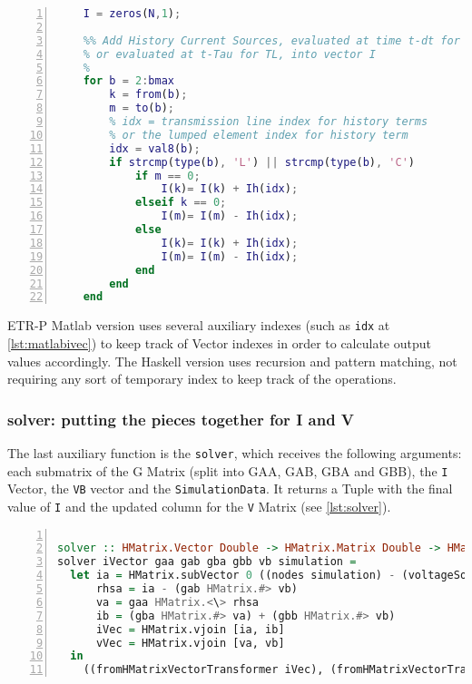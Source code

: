 \begin{lstlisting}[language=Matlab, numbers=left, caption={Building the I Vector with Matlab ETR-P}, captionpos=b, label={lst:matlabivec}]
    %% Clear vector I
    I = zeros(N,1);

    %% Add History Current Sources, evaluated at time t-dt for R,L,C elements
    % or evaluated at t-Tau for TL, into vector I
    %
    for b = 2:bmax
        k = from(b);
        m = to(b);
        % idx = transmission line index for history terms
        % or the lumped element index for history term
        idx = val8(b);
        if strcmp(type(b), 'L') || strcmp(type(b), 'C')
            if m == 0;
                I(k)= I(k) + Ih(idx);
            elseif k == 0;
                I(m)= I(m) - Ih(idx);
            else
                I(k)= I(k) + Ih(idx);
                I(m)= I(m) - Ih(idx);
            end
        end
    end

\end{lstlisting}


ETR-P Matlab version uses several auxiliary indexes (such as \lstinline!idx! at \cref{lst:matlabivec}) to keep track of Vector indexes in order to calculate output values accordingly. The Haskell version uses recursion and pattern matching, not requiring any sort of temporary index to keep track of the operations. 

\subsubsection{ solver: putting the pieces together for I and V }

The last auxiliary function is the \lstinline!solver!, which receives the following arguments: each submatrix of the G Matrix (split into GAA, GAB, GBA and GBB), the \lstinline!I! Vector, the \lstinline!VB! vector and the \lstinline!SimulationData!. It returns a Tuple with the final value of \lstinline!I! and the updated column for the \lstinline!V! Matrix (see \cref{lst:solver}). 

\begin{lstlisting}[language=Haskell, numbers=left, caption={Calculating the final values for I and V in each iteration step}, captionpos=b, label={lst:solver}]

solver :: HMatrix.Vector Double -> HMatrix.Matrix Double -> HMatrix.Matrix Double -> HMatrix.Matrix Double -> HMatrix.Matrix Double -> HMatrix.Vector Double -> SimulationData -> (Vector Double, Vector Double)
solver iVector gaa gab gba gbb vb simulation =
  let ia = HMatrix.subVector 0 ((nodes simulation) - (voltageSources simulation)) iVector
      rhsa = ia - (gab HMatrix.#> vb)
      va = gaa HMatrix.<\> rhsa
      ib = (gba HMatrix.#> va) + (gbb HMatrix.#> vb)
      iVec = HMatrix.vjoin [ia, ib]      
      vVec = HMatrix.vjoin [va, vb]
  in
    ((fromHMatrixVectorTransformer iVec), (fromHMatrixVectorTransformer vVec))
\end{lstlisting}


